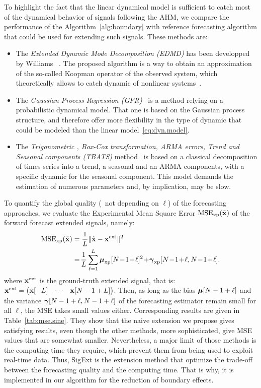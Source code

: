 To highlight the fact that the linear dynamical model is sufficient to catch most of the dynamical behavior of signals following the AHM, we compare the performance of the Algorithm~\ref{alg:boundary} with reference forecasting algorithm that could be used for extending such signals. These methods are:
\begin{itemize}
\item The \emph{Extended Dynamic Mode Decomposition (EDMD)} has been developped by Williams \etal~\cite{Williams15data}. The proposed algorithm is a way to obtain an approximation of the so-called Koopman operator of the observed system, which theoretically allows to catch dynamic of nonlinear systems~\cite{Korda18linear}.
\item The \emph{Gaussian Process Regression (GPR)}~\cite{Rasmussen06gaussian} is a method relying on a probabilistic dynamical model. That one is based on the Gaussian process structure, and therefore offer more flexibility in the type of dynamic that could be modeled than the linear model~\eqref{eq:dyn.model}.
\item The \emph{Trigonometric , Box-Cox transformation, ARMA errors, Trend and Seasonal components (TBATS)} method~\cite{DeLivera11forecasting} is based on a classical decomposition of times series into a trend, a seasonal and an ARMA components, with a specific dynamic for the seasonal component. This model demands the estimation of numerous parameters and, by implication, may be slow. 
\end{itemize}

To quantify the global quality (\ie~not depending on $\ell$) of the forecasting approaches, we evaluate the Experimental Mean Square Error $\mathrm{MSE_{xp}}(\tilde{{\mathbf x}})$ of the forward forecast extended signals, namely:
\begin{align}
\label{eq:mse}
\mathrm{MSE_{\xp}}(\tilde\bx) &= \dfrac1{L}\|\tilde\bx -\bx^\mathrm{ext}\|^2 \\
\nonumber
&=\! \dfrac1{L}\sum_{\ell=1}^L \bmu_{\xp}[N\!-\!1\!+\!\ell]^2 \!+\! \bgamma_{\xp}[N\!-\!1\!+\!\ell,N\!-\!1\!+\!\ell] .
\end{align}
where ${\mathbf x}^\mathrm{ext}$ is the ground-truth extended signal, that is: ${\mathbf x}^\mathrm{ext} = \begin{pmatrix}{\mathbf x}[-L] & \cdots & {\mathbf x}[N-1+L] \end{pmatrix}$. Then, as long as the bias $\boldsymbol{\mu}[N-1+\ell]$ and the variance $\boldsymbol{\gamma}[N-1+\ell,N-1+\ell]$ of the forecasting estimator remain small for all $\ell$, the MSE takes small values either. Corresponding results are given in Table~\ref{tab:mse.sine}. They show that the naive extension we propose gives satisfying results, even though the other methods, more sophisticated, give MSE values that are somewhat smaller. Nevertheless, a major limit of those methods is the computing time they require, which prevent them from being used to exploit real-time data. Thus, {\sf SigExt} is the extension method that optimize the trade-off between the forecasting quality and the computing time. That is why, it is implemented in our algorithm for the reduction of boundary effects.

